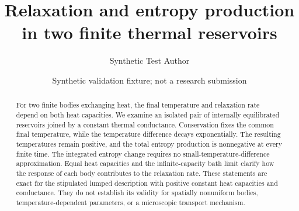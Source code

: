 \documentclass[aps,prx,reprint,groupedaddress]{revtex4-2}
\begin{document}
\title{Relaxation and entropy production in two finite thermal reservoirs}
\author{Synthetic Test Author}
\noaffiliation
\date{Synthetic validation fixture; not a research submission}
\begin{abstract}
For two finite bodies exchanging heat, the final temperature and relaxation rate depend on both heat capacities. We examine an isolated pair of internally equilibrated reservoirs joined by a constant thermal conductance. Conservation fixes the common final temperature, while the temperature difference decays exponentially. The resulting temperatures remain positive, and the total entropy production is nonnegative at every finite time. The integrated entropy change requires no small-temperature-difference approximation. Equal heat capacities and the infinite-capacity bath limit clarify how the response of each body contributes to the relaxation rate. These statements are exact for the stipulated lumped description with positive constant heat capacities and conductance. They do not establish its validity for spatially nonuniform bodies, temperature-dependent parameters, or a microscopic transport mechanism.
\end{abstract}
\maketitle









\appendix


\FloatBarrier
\clearpage
\makeatletter
\renewcommand{\bibsection}{%
  \par
  \onecolumngrid
  \vspace{19\p@}%
  \bib@device{\textwidth}{245.5\p@}%
  \vspace{3\p@}%
  \begin{center}{\bfseries REFERENCES}\end{center}%
  \vspace{4\p@}%
  \twocolumngrid
  \nobreak
}
\makeatother

\end{document}
